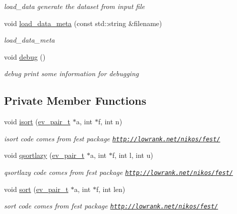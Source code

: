 \begin{DoxyCompactItemize}
\begin{DoxyCompactList}\small\item\em load\+\_\+data generate the dataset from input file \end{DoxyCompactList}\item 
void \hyperlink{class_dataset_aef15478d96284ded081a69978cfa6264}{load\+\_\+data\+\_\+meta} (const std\+::string \&filename)
\begin{DoxyCompactList}\small\item\em load\+\_\+data\+\_\+meta \end{DoxyCompactList}\item 
void \hyperlink{class_dataset_afaa8b8fb1814371e6a5a762a11db87b3}{debug} ()
\begin{DoxyCompactList}\small\item\em debug print some information for debugging \end{DoxyCompactList}\end{DoxyCompactItemize}
\subsection*{Private Member Functions}
\begin{DoxyCompactItemize}
\item 
void \hyperlink{class_dataset_a4dc9b552f1e57a40fa4424b664b68190}{isort} (\hyperlink{structev__pair__t}{ev\+\_\+pair\+\_\+t} $\ast$a, int $\ast$f, int n)
\begin{DoxyCompactList}\small\item\em isort code comes from {\ttfamily fest package} \href{http://lowrank.net/nikos/fest/}{\tt http\+://lowrank.\+net/nikos/fest/} \end{DoxyCompactList}\item 
void \hyperlink{class_dataset_a9350f5127cae101b51b43f98afe3756d}{qsortlazy} (\hyperlink{structev__pair__t}{ev\+\_\+pair\+\_\+t} $\ast$a, int $\ast$f, int l, int u)
\begin{DoxyCompactList}\small\item\em qsortlazy code comes from {\ttfamily fest package} \href{http://lowrank.net/nikos/fest/}{\tt http\+://lowrank.\+net/nikos/fest/} \end{DoxyCompactList}\item 
void \hyperlink{class_dataset_ab85cc6af59b4c9ca82c825c74c945546}{sort} (\hyperlink{structev__pair__t}{ev\+\_\+pair\+\_\+t} $\ast$a, int $\ast$f, int len)
\begin{DoxyCompactList}\small\item\em sort code comes from {\ttfamily fest package} \href{http://lowrank.net/nikos/fest/}{\tt http\+://lowrank.\+net/nikos/fest/} \end{DoxyCompactList}\end{DoxyCompactItemize}
